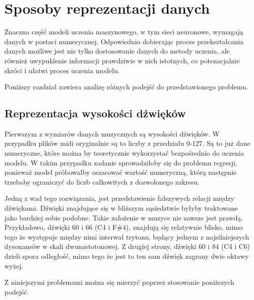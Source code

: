 \chapter{Sposoby reprezentacji danych}
{
    Znaczna część modeli uczenia maszynowego, w tym sieci neuronowe, wymagają 
    danych w postaci numerycznej. Odpowiednio dobierając proces przekształcania danych
    możliwe jest nie tylko dostosowanie danych do metody uczenia, ale również
    uwypuklenie informacji prawdziwie w nich istotnych, co potenacjalnie skróci i ułatwi proces uczenia modelu.

    Poniższy rozdział zawiera analizę różnych podejść do przedstawionego problemu.

    \section{Reprezentacja wysokości dźwięków}
    {
        Pierwszym z wymiarów danych muzycznych są wysokości dźwięków. W przypadku plików midi
        oryginalnie są to liczby z przedziału 0-127. Są to już dane numeryczne, które
        można by teoretycznie wykorzystać bezpośrednio do uczenia modelu.
        W takim przypadku zadanie sprowadziłoby się do problemu regresji, ponieważ model próbowałby
        oszacować wartość numeryczną, którą następnie trzebaby ograniczyć do liczb całkowitych z dozwolonego zakresu.

        Jedną z wad tego rozwiązania, jest przedstawienie fałszywych relacji między dźwiękami.
        Dźwięki znajdujące się w bliższym sąsiedztwie byłyby traktowane jako bardziej sobie podobne.
        Takie założenie w muzyce nie zawsze jest prawdą. Przykładowo, dźwięki 60 i 66 (C4 i F\#4), znajdują się
        relatywnie blisko, mimo tego że występuje między nimi interwał trytonu, będący jednym z najsilniejszych dysonansów w skali 
        dwunastotonowej. Z drugiej strony, dźwięki 60 i 84 (C4 i C6) dzieli spora odległość, mimo tego że jest to ten sam dźwięk
        zagrany dwie oktawy wyżej.

        Z niniejszymi problemami można się mierzyć poprzez stosowanie poniższych podejść.

}}
